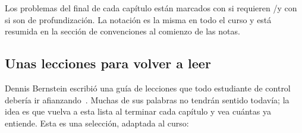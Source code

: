 Los problemas del final de cada capítulo están marcados con \etiquetaM{} si requieren \matlab/\simulink y con \etiquetaEstrella{} si son de profundización. La notación es la misma en todo el curso y está resumida en la sección de convenciones al comienzo de las notas.

\subsection{Unas lecciones para volver a leer}

Dennis Bernstein escribió una guía de lecciones que todo estudiante de control debería ir afianzando~\citep{Ber97}. Muchas de sus palabras no tendrán sentido todavía; la idea es que vuelva a esta lista al terminar cada capítulo y vea cuántas ya entiende. Esta es una selección, adaptada al curso:

